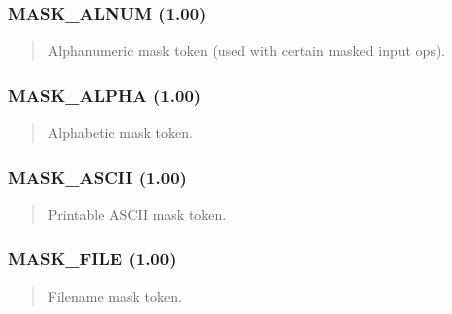 \documentclass[letterpaper,10pt,english]{sphinxmanual}
\begin{document}
\subsubsection{MASK\_ALNUM (1.00)}
\label{\detokenize{ppl:mask-alnum-1-00}}\begin{quote}

\sphinxAtStartPar
{}
\begin{description}
\sphinxAtStartPar
Alphanumeric mask token (used with certain masked input ops).

\end{description}
\end{quote}


\subsubsection{MASK\_ALPHA (1.00)}
\label{\detokenize{ppl:mask-alpha-1-00}}\begin{quote}

\sphinxAtStartPar
{}
\begin{description}
\sphinxAtStartPar
Alphabetic mask token.

\end{description}
\end{quote}


\subsubsection{MASK\_ASCII (1.00)}
\label{\detokenize{ppl:mask-ascii-1-00}}\begin{quote}

\sphinxAtStartPar
{}
\begin{description}
\sphinxAtStartPar
Printable ASCII mask token.

\end{description}
\end{quote}


\subsubsection{MASK\_FILE (1.00)}
\label{\detokenize{ppl:mask-file-1-00}}\begin{quote}

\sphinxAtStartPar
{}
\begin{description}
\sphinxAtStartPar
Filename mask token.

\end{description}
\end{quote}
\end{document}
